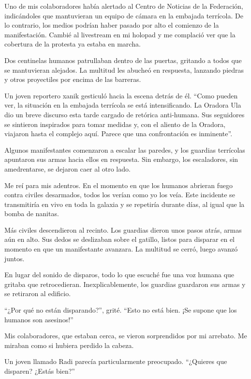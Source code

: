\documentclass[spanish,12pt,a4paper,oneside,titlepage]{book}
\begin{document}
    Uno de mis colaboradores había alertado al Centro de Noticias de la Federación, indicándoles que mantuvieran un equipo de cámara en la embajada terrícola. De lo contrario, los medios podrían haber pasado por alto el comienzo de la manifestación. Cambié al livestream en mi holopad y me complació ver que la cobertura de la protesta ya estaba en marcha.

    Dos centinelas humanos patrullaban dentro de las puertas, gritando a todos que se mantuvieran alejados. La multitud les abucheó en respuesta, lanzando piedras y otros proyectiles por encima de las barreras.

    Un joven reportero xanik gesticuló hacia la escena detrás de él. ``Como pueden ver, la situación en la embajada terrícola se está intensificando. La Oradora Ula dio un breve discurso esta tarde cargado de retórica anti-humana. Sus seguidores se sintieron inspirados para tomar medidas y, con el aliento de la Oradora, viajaron hasta el complejo aquí. Parece que una confrontación es inminente''.

    Algunos manifestantes comenzaron a escalar las paredes, y los guardias terrícolas apuntaron sus armas hacia ellos en respuesta. Sin embargo, los escaladores, sin amedrentarse, se dejaron caer al otro lado.

    Me reí para mis adentros. En el momento en que los humanos abrieran fuego contra civiles desarmados, todos los verían como yo los veía. Este incidente se transmitiría en vivo en toda la galaxia y se repetiría durante días, al igual que la bomba de nanitas.

    Más civiles descendieron al recinto. Los guardias dieron unos pasos atrás, armas aún en alto. Sus dedos se deslizaban sobre el gatillo, listos para disparar en el momento en que un manifestante avanzara. La multitud se cerró, luego avanzó juntos.

    En lugar del sonido de disparos, todo lo que escuché fue una voz humana que gritaba que retrocedieran. Inexplicablemente, los guardias guardaron sus armas y se retiraron al edificio.

    ``¿Por qué no están disparando?'', grité. ``Esto no está bien. ¡Se supone que los humanos son asesinos!''

    Mis colaboradores, que estaban cerca, se vieron sorprendidos por mi arrebato. Me miraban como si hubiera perdido la cabeza.

    Un joven llamado Radi parecía particularmente preocupado. ``¿Quieres que disparen? ¿Estás bien?''
\end{document}
